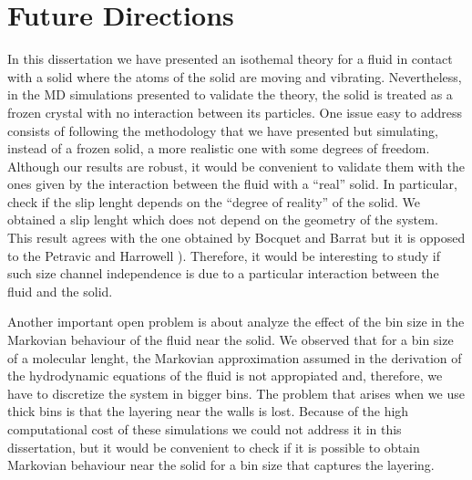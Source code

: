 \documentclass[b5paper,openright,10pt]{book}
\begin{document}
\chapter{Future Directions}\label{Chap:Future}
In this dissertation we have presented an isothemal theory for a fluid in contact with a solid where the atoms of the solid are moving and vibrating. 
Nevertheless, in the MD simulations presented to validate the theory, the solid is treated as a frozen crystal with no interaction between its particles.
One issue easy to address consists of following the methodology that we have presented but simulating, instead of a frozen solid, a more realistic one with some degrees of freedom. 
Although our results are robust, it would be convenient to validate them with the ones given by the interaction between the fluid with a ``real'' solid. 
In particular, check if the slip lenght depends on the ``degree of reality'' of the solid. We obtained a slip lenght which does not depend on the geometry of the system. This result agrees with the one obtained by Bocquet and Barrat \cite{Bocquet1994} but it is opposed to the Petravic and Harrowell \cite{Petravic2007}). Therefore, it would be interesting to study if such size channel independence is due to a particular interaction between the fluid and the solid. 

Another important open problem is about analyze the effect of the bin size in the Markovian behaviour of the fluid near the solid. 
We observed that for a bin size of a molecular lenght, the Markovian approximation assumed in the derivation of the hydrodynamic equations of the fluid is not appropiated and, therefore, we have to discretize the system in bigger bins. The problem that arises when we use thick bins is that the layering near the walls is lost. 
Because of the high computational cost of these simulations we could not address it in this dissertation, but it would be convenient to check if it is possible to obtain Markovian behaviour near the solid for a bin size that captures the layering. 


\end{document}
